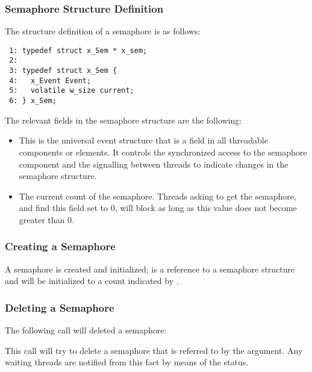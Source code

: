 \subsubsection{Semaphore Structure Definition}

The structure definition of a semaphore is as follows:

\bcode
\begin{verbatim}
 1: typedef struct x_Sem * x_sem;
 2:
 3: typedef struct x_Sem {
 4:   x_Event Event;
 5:   volatile w_size current;
 6: } x_Sem;
\end{verbatim}
\ecode

The relevant fields in the semaphore structure are the following:

\begin{itemize}
\item {} This is the universal event structure that is a field
in all threadable components or elements. It controls the synchronized access
to the semaphore component and the signalling between threads to indicate changes
in the semaphore structure.
\item {} The current count of the
semaphore. Threads asking to get the semaphore, and find this field set to
0, will block as long as this value does not become greater than 0.
\end{itemize}


\subsubsection{Creating a Semaphore}


A semaphore is created and initialized;  is a reference to a semaphore
structure and will be initialized to a count indicated by .

\subsubsection{Deleting a Semaphore}

The following call will deleted a semaphore:


This call will try to delete a semaphore that is referred to by the  argument. 
Any waiting threads are notified from this fact by means of the  status.

